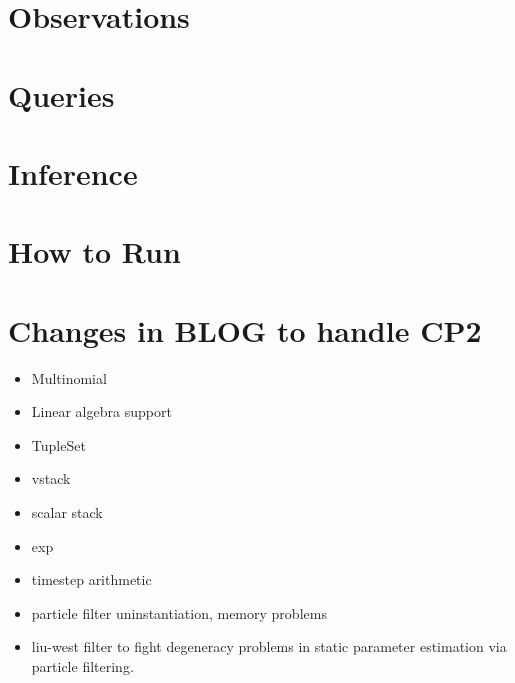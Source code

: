 \documentclass[11pt]{article}
\begin{document}
\section{Observations}

\section{Queries}

\section{Inference}

\section{How to Run}

\section{Changes in BLOG to handle CP2}
\begin{itemize}
\item Multinomial
\item Linear algebra support
\item TupleSet
\item vstack
\item scalar stack
\item exp
\item timestep arithmetic
\item particle filter uninstantiation, memory problems
\item liu-west filter to fight degeneracy problems in static parameter estimation via particle filtering.
\end{itemize}





\end{document}
